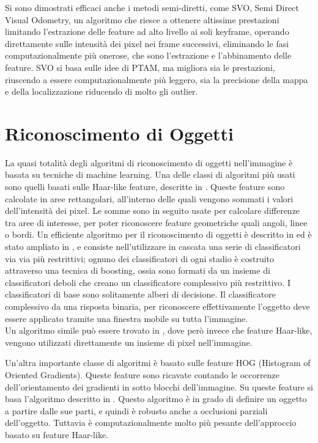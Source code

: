 Si sono dimostrati efficaci anche i metodi semi-diretti, come SVO, Semi Direct Visual Odometry, un algoritmo che riesce a ottenere altissime prestazioni limitando l'estrazione delle feature ad alto livello ai soli keyframe, operando direttamente sulle intensità dei pixel nei frame successivi, eliminando le fasi computazionalmente più onerose, che sono l'estrazione e l'abbinamento delle feature. SVO si basa sulle idee di PTAM, ma migliora sia le prestazioni, riuscendo a essere computazionalmente più leggero, sia la precisione della mappa e della localizzazione riducendo di molto gli outlier.

\section{Riconoscimento di Oggetti}

La quasi totalità degli algoritmi di riconoscimento di oggetti nell'immagine è basata su tecniche di machine learning.
Una delle classi di algoritmi più usati sono quelli basati sulle Haar-like feature, descritte in \cite{710772}.
Queste feature sono calcolate in aree rettangolari, all'interno delle quali vengono sommati i valori dell'intensità dei pixel. Le somme sono in seguito usate per calcolare differenze tra aree di interesse, per poter riconoscere feature geometriche quali angoli, linee o bordi.
Un efficiente algoritmo per il riconoscimento di oggetti è descritto in \cite{Viola01rapidobject} ed è stato ampliato in \cite{Lienhart02anextended}, e consiste nell'utilizzare in cascata una serie di classificatori via via più restrittivi; ognuno dei classificatori di ogni stadio è costruito attraverso una tecnica di boosting, ossia sono formati da un insieme di classificatori deboli che creano un classificatore complessivo più restrittivo. I classificatori di base sono solitamente alberi di decisione. Il classificatore complessivo da una risposta binaria, per riconoscere effettivamente l'oggetto deve essere applicato tramite una finestra mobile su tutta l'immagine. \\
Un algoritmo simile può essere trovato in \cite{journals/ijista/AbramsonSG07}, dove però invece che feature Haar-like, vengono utilizzati direttamente un insieme di pixel nell'immagine.

Un'altra importante classe di algoritmi è basato sulle feature HOG (Histogram of Oriented Gradients). Queste feature sono ricavate contando le occorrenze dell'orientamento dei gradienti in sotto blocchi dell'immagine.
Su queste feature si basa l'algoritmo descritto in \cite{lsvm-pami}. Questo algoritmo è in grado di definire un oggetto a partire dalle sue parti, e quindi è robusto anche a occlusioni parziali dell'oggetto. Tuttavia è computazionalmente molto più pesante dell'approccio basato su feature Haar-like.

